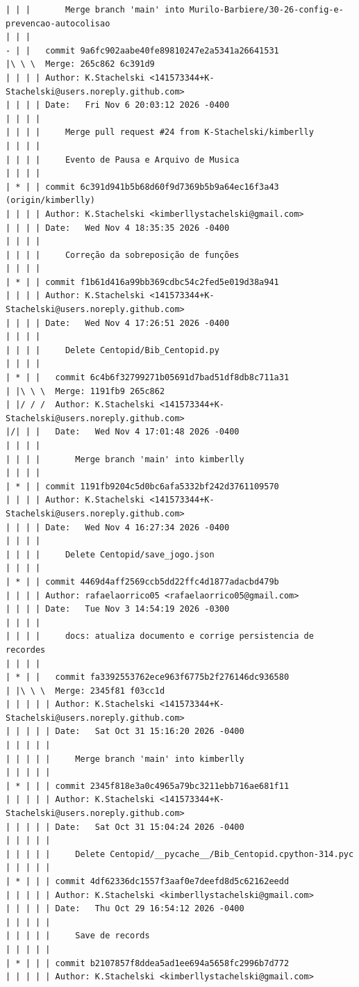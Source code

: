 \documentclass[12pt]{article}
\begin{document}
\begin{lstlisting}
| | |       Merge branch 'main' into Murilo-Barbiere/30-26-config-e-prevencao-autocolisao
| | |   
- | |   commit 9a6fc902aabe40fe89810247e2a5341a26641531
|\ \ \  Merge: 265c862 6c391d9
| | | | Author: K.Stachelski <141573344+K-Stachelski@users.noreply.github.com>
| | | | Date:   Fri Nov 6 20:03:12 2026 -0400
| | | | 
| | | |     Merge pull request #24 from K-Stachelski/kimberlly
| | | |     
| | | |     Evento de Pausa e Arquivo de Musica
| | | | 
| * | | commit 6c391d941b5b68d60f9d7369b5b9a64ec16f3a43 (origin/kimberlly)
| | | | Author: K.Stachelski <kimberllystachelski@gmail.com>
| | | | Date:   Wed Nov 4 18:35:35 2026 -0400
| | | | 
| | | |     Correção da sobreposição de funções
| | | | 
| * | | commit f1b61d416a99bb369cdbc54c2fed5e019d38a941
| | | | Author: K.Stachelski <141573344+K-Stachelski@users.noreply.github.com>
| | | | Date:   Wed Nov 4 17:26:51 2026 -0400
| | | | 
| | | |     Delete Centopid/Bib_Centopid.py
| | | |   
| * | |   commit 6c4b6f32799271b05691d7bad51df8db8c711a31
| |\ \ \  Merge: 1191fb9 265c862
| |/ / /  Author: K.Stachelski <141573344+K-Stachelski@users.noreply.github.com>
|/| | |   Date:   Wed Nov 4 17:01:48 2026 -0400
| | | |   
| | | |       Merge branch 'main' into kimberlly
| | | | 
| * | | commit 1191fb9204c5d0bc6afa5332bf242d3761109570
| | | | Author: K.Stachelski <141573344+K-Stachelski@users.noreply.github.com>
| | | | Date:   Wed Nov 4 16:27:34 2026 -0400
| | | | 
| | | |     Delete Centopid/save_jogo.json
| | | | 
| * | | commit 4469d4aff2569ccb5dd22ffc4d1877adacbd479b
| | | | Author: rafaelaorrico05 <rafaelaorrico05@gmail.com>
| | | | Date:   Tue Nov 3 14:54:19 2026 -0300
| | | | 
| | | |     docs: atualiza documento e corrige persistencia de recordes
| | | |   
| * | |   commit fa3392553762ece963f6775b2f276146dc936580
| |\ \ \  Merge: 2345f81 f03cc1d
| | | | | Author: K.Stachelski <141573344+K-Stachelski@users.noreply.github.com>
| | | | | Date:   Sat Oct 31 15:16:20 2026 -0400
| | | | | 
| | | | |     Merge branch 'main' into kimberlly
| | | | | 
| * | | | commit 2345f818e3a0c4965a79bc3211ebb716ae681f11
| | | | | Author: K.Stachelski <141573344+K-Stachelski@users.noreply.github.com>
| | | | | Date:   Sat Oct 31 15:04:24 2026 -0400
| | | | | 
| | | | |     Delete Centopid/__pycache__/Bib_Centopid.cpython-314.pyc
| | | | | 
| * | | | commit 4df62336dc1557f3aaf0e7deefd8d5c62162eedd
| | | | | Author: K.Stachelski <kimberllystachelski@gmail.com>
| | | | | Date:   Thu Oct 29 16:54:12 2026 -0400
| | | | | 
| | | | |     Save de records
| | | | | 
| * | | | commit b2107857f8ddea5ad1ee694a5658fc2996b7d772
| | | | | Author: K.Stachelski <kimberllystachelski@gmail.com>

\end{lstlisting}
\end{document}
